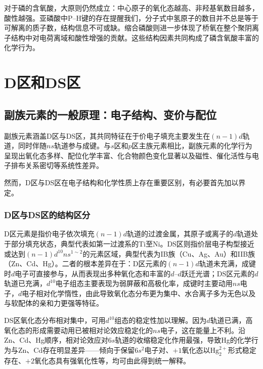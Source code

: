 \documentclass[UTF8]{ctexbook}
\begin{document}
对于磷的含氧酸，大原则仍然成立：中心原子的氧化态越高、非羟基氧数目越多，酸性越强。亚磷酸中P--H键的存在提醒我们，分子式中氢原子的数目并不总是等于可解离的质子数，结构信息不可或缺。缩合磷酸则进一步体现了桥氧在整个聚阴离子结构中对电荷离域和酸性增强的贡献。这些结构因素共同构成了磷含氧酸丰富的化学行为。

\newpage





\newpage
\section{D区和DS区}

\subsection{副族元素的一般原理：电子结构、变价与配位}

副族元素涵盖D区与DS区，其共同特征在于价电子填充主要发生在$(n-1)d$轨道，同时伴随$ns$轨道参与成键。与$s$区和$p$区主族元素相比，副族元素的化学行为呈现出氧化态多样、配位化学丰富、化合物颜色变化显著以及磁性、催化活性与电子排布关系密切等系统性差异。

然而，D区与DS区在电子结构和化学性质上存在重要区别，有必要首先加以界定。

\subsubsection{D区与DS区的结构区分}

D区元素是指价电子依次填充$(n-1)d$轨道的过渡金属，其原子或离子的$d$轨道处于部分填充状态，典型代表如第一过渡系的Ti至Ni。DS区则指价层电子构型接近或达到$(n-1)d^{10}ns^{1\sim 2}$的元素区域，典型代表为IB族（Cu、Ag、Au）和IIB族（Zn、Cd、Hg）。二者的根本差异在于：D区元素的$(n-1)d$轨道未充满，成键时$d$电子可直接参与，从而表现出多种氧化态和丰富的$d$--$d$跃迁光谱；DS区元素的$d$轨道已充满，$d^{10}$电子组态主要表现为弱屏蔽和高极化率，成键时主要动用$ns$电子，$d$电子相对化学惰性，由此导致氧化态分布更为集中、水合离子多为无色以及与软配体的亲和力更强等特征。

DS区氧化态分布相对集中，可用$d^{10}$组态的稳定性加以理解。因为$d$轨道已满，高氧化态的形成需要动用已被相对论效应稳定化的$ns$电子，这在能量上不利。沿Zn、Cd、Hg顺序，相对论效应对$6s$轨道的收缩稳定化作用最强，导致Hg的化学行为与Zn、Cd存在明显差异——倾向于保留$6s^2$电子对、$+1$氧化态以$\mathrm{Hg_2^{2+}}$形式稳定存在、$+2$氧化态具有强氧化性等，均可由此得到统一解释。
\end{document}
